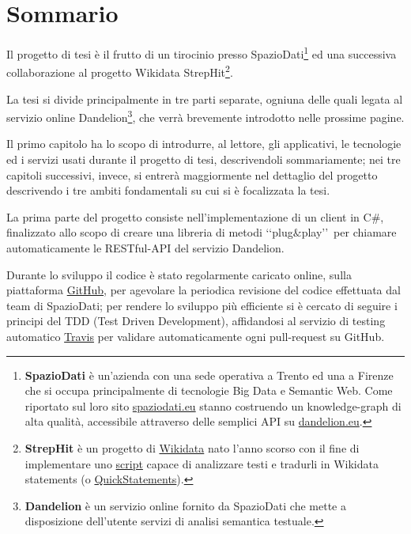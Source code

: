 \chapter*{Sommario} %
\label{sommario}

Il progetto di tesi è il frutto di un tirocinio presso SpazioDati\footnote{
    \textbf{SpazioDati} è un'azienda con una sede operativa a Trento ed una a Firenze che si occupa principalmente di tecnologie Big Data e Semantic Web.
    Come riportato sul loro sito \href{https://spaziodati.eu/it/}{spaziodati.eu} stanno costruendo un knowledge-graph di alta qualità, accessibile attraverso delle semplici API 
    su \href{https://dandelion.eu/}{dandelion.eu}.
}
ed una successiva collaborazione al progetto Wikidata StrepHit\footnote{
    \textbf{StrepHit} è un progetto di \href{https://www.wikidata.org/wiki/Wikidata:Main_Page}{Wikidata} nato l'anno scorso con il fine di implementare uno \href{https://www.mediawiki.org/wiki/StrepHit}{script} 
    capace di analizzare testi e tradurli in Wikidata statements (o \href{https://www.wikidata.org/wiki/Help:QuickStatements}{QuickStatements}). 
}. 

La tesi si divide principalmente in tre parti separate, ogniuna delle quali legata al servizio online Dandelion\footnote{
    \textbf{Dandelion} è un servizio online fornito da SpazioDati che mette a disposizione dell'utente servizi di analisi semantica testuale.
}, che verrà brevemente introdotto nelle prossime pagine. 

Il primo capitolo ha lo scopo di introdurre, al lettore, gli applicativi, le tecnologie ed i servizi usati durante il progetto di tesi, descrivendoli sommariamente; 
nei tre capitoli successivi, invece, si entrerà maggiormente nel dettaglio del progetto descrivendo i tre ambiti fondamentali su cui si è focalizzata la tesi.

La prima parte del progetto consiste nell'implementazione di un client in C$\#$, finalizzato allo scopo di creare una libreria di metodi \lq\lq plug$\&$play\rq\rq\ 
per chiamare automaticamente le RESTful-API del servizio Dandelion. 

Durante lo sviluppo il codice è stato regolarmente caricato online, sulla piattaforma \href{https://github.com/}{GitHub}, per agevolare la periodica revisione del codice effettuata dal team di SpazioDati; 
per rendere lo sviluppo più efficiente si è cercato di seguire i principi del TDD (Test Driven Development), affidandosi al servizio di testing automatico \href{https://www.travis-ci.com/}{Travis} 
per validare automaticamente ogni pull-request su GitHub. 

